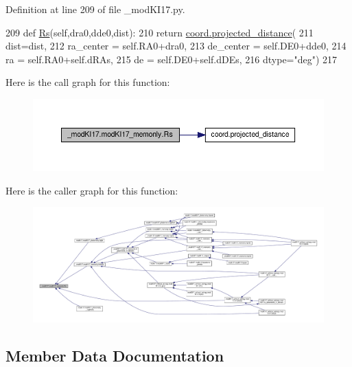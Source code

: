 Definition at line 209 of file \+\_\+mod\+K\+I17.\+py.


\begin{DoxyCode}
209     \textcolor{keyword}{def }\hyperlink{namespacedsph__model_af25a421d0de32d247b1aa0e8cf4894e3}{Rs}(self,dra0,dde0,dist):
210         \textcolor{keywordflow}{return} \hyperlink{namespacecoord_a46aebc3089e078f4597812fecdd0975f}{coord.projected\_distance}(
211             dist=dist,
212             ra\_center = self.RA0+dra0,
213             de\_center = self.DE0+dde0,
214             ra = self.RA0+self.dRAs,
215             de = self.DE0+self.dDEs,
216             dtype=\textcolor{stringliteral}{"deg"})
217 
\end{DoxyCode}
Here is the call graph for this function\+:\nopagebreak
\begin{figure}[H]
\begin{center}
\leavevmode
\includegraphics[width=350pt]{d9/d8f/class__modKI17_1_1modKI17__memonly_a335fdfaf1863a33e9d52cfc5d299b6dc_cgraph}
\end{center}
\end{figure}
Here is the caller graph for this function\+:\nopagebreak
\begin{figure}[H]
\begin{center}
\leavevmode
\includegraphics[width=350pt]{d9/d8f/class__modKI17_1_1modKI17__memonly_a335fdfaf1863a33e9d52cfc5d299b6dc_icgraph}
\end{center}
\end{figure}


\subsection{Member Data Documentation}
\mbox{\label{class__modKI17_1_1modKI17__memonly_ab9834e8fbb5fba20c559bc2e42ef15b4}} 
